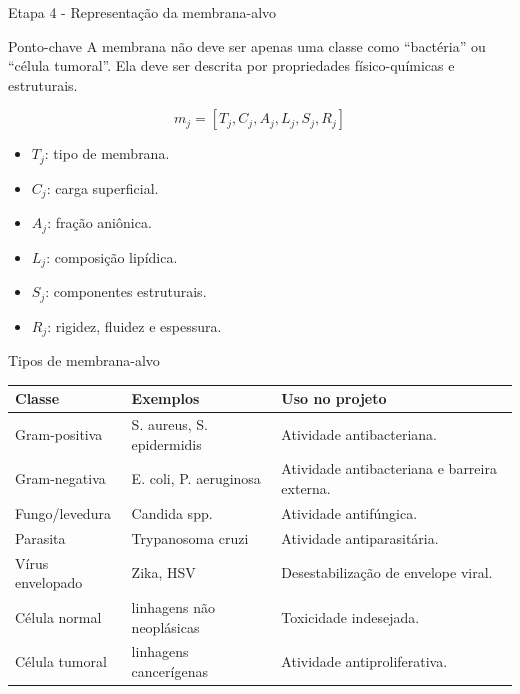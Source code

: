 \documentclass[aspectratio=169,10pt]{beamer}
\begin{document}
\begin{frame}{Etapa 4 - Representação da membrana-alvo}
\begin{block}{Ponto-chave}
A membrana não deve ser apenas uma classe como ``bactéria'' ou ``célula tumoral''. Ela deve ser descrita por propriedades físico-químicas e estruturais.
\end{block}

\vspace{0.2cm}
\begin{equation*}
  m_j = [T_j, C_j, A_j, L_j, S_j, R_j]
\end{equation*}

\begin{itemize}
  \item $T_j$: tipo de membrana.
  \item $C_j$: carga superficial.
  \item $A_j$: fração aniônica.
  \item $L_j$: composição lipídica.
  \item $S_j$: componentes estruturais.
  \item $R_j$: rigidez, fluidez e espessura.
\end{itemize}
\end{frame}

\begin{frame}{Tipos de membrana-alvo}
\small
\begin{center}
\begin{tabular}{p{3.0cm}p{4.2cm}p{5.0cm}}
\toprule
\textbf{Classe} & \textbf{Exemplos} & \textbf{Uso no projeto} \\
\midrule
Gram-positiva & S. aureus, S. epidermidis & Atividade antibacteriana. \\
Gram-negativa & E. coli, P. aeruginosa & Atividade antibacteriana e barreira externa. \\
Fungo/levedura & Candida spp. & Atividade antifúngica. \\
Parasita & Trypanosoma cruzi & Atividade antiparasitária. \\
Vírus envelopado & Zika, HSV & Desestabilização de envelope viral. \\
Célula normal & linhagens não neoplásicas & Toxicidade indesejada. \\
Célula tumoral & linhagens cancerígenas & Atividade antiproliferativa. \\
\bottomrule
\end{tabular}
\end{center}
\end{frame}
\end{document}
